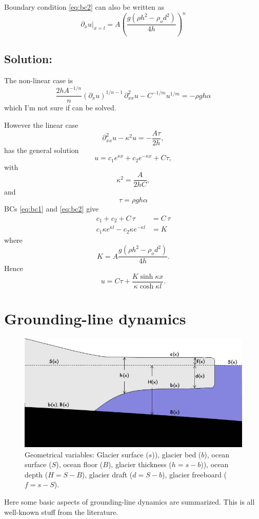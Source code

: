 \documentclass[10pt,a4paper]{book}
\newcommand{\p}{\partial}
\begin{document}
Boundary condition \eqref{eq:bc2} can also be written as
\[
\p_x u |_{x=l} = A \left ( \frac{g (\rho h^2- \rho_o d^2)}{4 h} \right )^n
\]


\section{Solution:}
The non-linear case is
\[
\frac{2 h A^{-1/n}}{n} (\p_x u)^{1/n-1} \, \p^2_{xx} u- C^{-1/m} u^{1/m}  = - \rho g h \alpha
\]
which I'm not sure if can be solved.

However the linear case
\[
\p^2_{xx} u - \kappa^2 u  = - \frac{A \tau}{2 h} ,
\]
has the general solution
\[
u=c_1 e^{\kappa x} + c_2 e^{-\kappa x} + C \tau ,
\]
with
\[
\kappa^2=\frac{A}{2hC} ,
\]
and
\[ \tau=\rho g h \alpha \]
BCs \eqref{eq:bc1} and \eqref{eq:bc2} give
\begin{align*}
c_1 + c_2 + C \, \tau&= C \, \tau \\
c_1 \kappa e^{\kappa l} - c_2 \kappa e^{-\kappa l} &= K
\end{align*}
where
\[
K=A \frac{ g (\rho h^2- \rho_o d^2)}{4 h} .
\]
Hence
\[
u=C \tau +\frac{K \sinh \kappa x}{\kappa \cosh \kappa l}.
\]




\chapter{Grounding-line dynamics}


\begin{figure}
\centerline{\includegraphics[width=12cm]{ProblemGeometry.jpg}}
\caption{Geometrical variables: Glacier surface ($s$)), glacier bed ($b$), ocean surface ($S$), ocean floor ($B$), 
glacier thickness ($h=s-b$)), ocean depth ($H=S-B$), glacier draft ($d=S-b$), glacier freeboard ($f=s-S$). 
\label{fig:PG2}}
\end{figure}


Here some basic aspects of grounding-line dynamics are
summarized. This is all well-known stuff from the literature.
\end{document}
